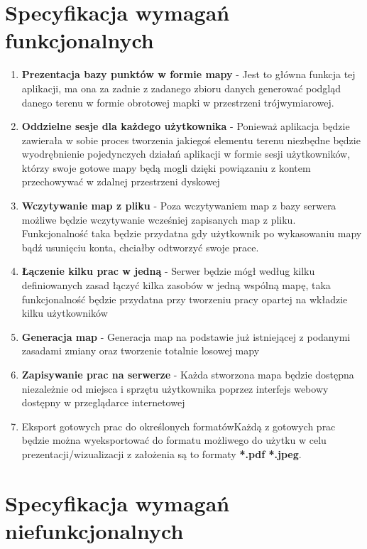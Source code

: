 \section{Specyfikacja wymagań funkcjonalnych}
\begin{enumerate}
  \item \textbf{Prezentacja bazy punktów w formie mapy} - Jest to główna funkcja tej aplikacji, ma ona za zadnie z zadanego zbioru danych generować podgląd danego terenu w formie obrotowej mapki w przestrzeni trójwymiarowej.

  \item \textbf{Oddzielne sesje dla każdego użytkownika} - Ponieważ aplikacja będzie zawierała w sobie proces tworzenia jakiegoś elementu terenu niezbędne będzie wyodrębnienie pojedynczych działań aplikacji w formie sesji użytkowników, którzy swoje gotowe mapy będą mogli dzięki powiązaniu z kontem przechowywać w zdalnej przestrzeni dyskowej

  \item \textbf{Wczytywanie map z pliku} - Poza wczytywaniem map z bazy serwera możliwe będzie wczytywanie wcześniej zapisanych map z pliku. Funkcjonalność taka będzie przydatna gdy użytkownik po wykasowaniu mapy bądź usunięciu konta, chciałby odtworzyć swoje prace.

  \item \textbf{Łączenie kilku prac w jedną} - Serwer będzie mógł według kilku definiowanych zasad łączyć kilka zasobów w jedną wspólną mapę, taka funkcjonalność będzie przydatna przy tworzeniu pracy opartej na wkładzie kilku użytkowników

  \item \textbf{Generacja map} - Generacja map na podstawie już istniejącej z podanymi zasadami zmiany oraz tworzenie totalnie losowej mapy

  \item \textbf{Zapisywanie prac na serwerze} - Każda stworzona mapa będzie dostępna niezależnie od miejsca i sprzętu użytkownika poprzez interfejs webowy dostępny w przeglądarce internetowej

  \item{Eksport gotowych prac do określonych formatów}{Każdą z gotowych prac będzie można wyeksportować do formatu możliwego do użytku w celu prezentacji/wizualizacji z założenia są to formaty \textbf{*.pdf *.jpeg}.}
\end{enumerate}

\section{Specyfikacja wymagań niefunkcjonalnych}

